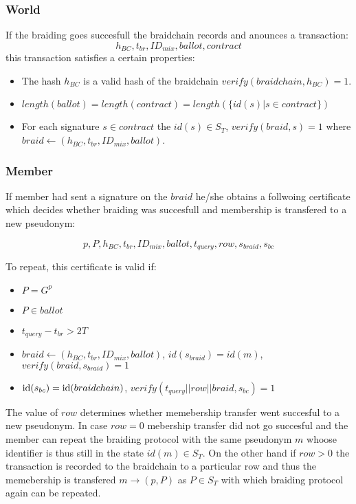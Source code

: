\documentclass[12pt]{article}
\begin{document}
\subsubsection*{World}

If the braiding goes succesfull the braidchain records and anounces a transaction:
\begin{equation}
  h_{BC}, t_{br}, ID_{mix}, ballot, contract
\end{equation}
this transaction satisfies a certain properties:
\begin{itemize}
\item The hash $h_{BC}$ is a valid hash of the braidchain $verify(braidchain, h_{BC})=1$.
\item $length(ballot) = length(contract) = length(\{id(s) | s\in contract\})$
\item For each signature $s \in contract$ the $id(s)\in S_T$, $verify(braid, s)=1$ where $braid \leftarrow (h_{BC}, t_{br}, ID_{mix}, ballot)$.
\end{itemize}



\subsubsection*{Member}

If member had sent a signature on the $braid$ he/she obtains a follwoing certificate which decides whether braiding was succesfull and membership is transfered to a new pseudonym: 

\begin{equation}
 p, P, h_{BC}, t_{br}, ID_{mix}, ballot, t_{query}, row, s_{braid}, s_{bc}
\end{equation}


To repeat, this certificate is valid if:
\begin{itemize}
\item $P = G^p$
\item $P \in ballot$
\item $t_{query} - t_{br} > 2T$
\item $braid \leftarrow (h_{BC}, t_{br}, ID_{mix}, ballot)$, $id(s_{braid})=id(m)$, $verify(braid, s_{braid})=1$
\item ${\rm id}(s_{bc}) = {\rm id}(braidchain)$, $verify(t_{query}||row||braid, s_{bc})=1$
\end{itemize}

The value of $row$ determines whether memebership transfer went succesful to a new pseudonym. In case $row=0$ mebership transfer did not go succesful and the member can repeat the braiding protocol with the same pseudonym $m$ whoose identifier is thus still in the state $id(m)\in S_T$. On the other hand if $row>0$ the transaction is recorded to the braidchain to a particular row and thus the memebership is transfered $m \to (p, P)$ as $P \in S_T$ with which braiding protocol again can be repeated.
\end{document}
